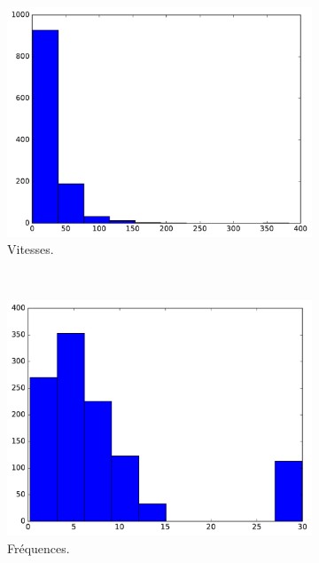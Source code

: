 \begin{appendices}
	\begin{figure}[htbp]
		\begin{subfigure}[t]{\subImgWclicks}
			\centering
			\includegraphics[width=\textwidth]{figures/ch3/spaceA_filteredSpeed}
			\caption{Vitesses.}
			\label{fig:spaceA_filteredSpeed}
		\end{subfigure}
		~
		\begin{subfigure}[t]{\subImgWclicks}
			\centering
			\includegraphics[width=\textwidth]{figures/ch3/spaceA_frequency}
			\caption{Fréquences.}
			\label{fig:spaceA_frequency}
		\end{subfigure}
		~
		\begin{subfigure}[t]{\subImgWclicks}
			\centering

\end{subfigure}
\end{figure}
\end{appendices}
